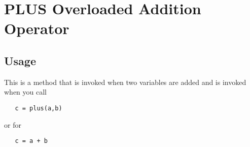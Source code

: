 \section{PLUS Overloaded Addition Operator}

\subsection{Usage}

This is a method that is invoked when two variables are added
and is invoked when you call
\begin{verbatim}
   c = plus(a,b)
\end{verbatim}
or for
\begin{verbatim}
   c = a + b
\end{verbatim}
